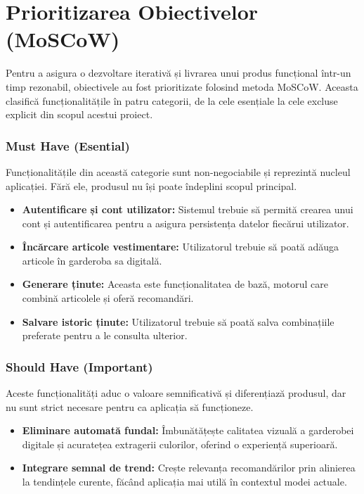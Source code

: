 \section{Prioritizarea Obiectivelor (MoSCoW)}

Pentru a asigura o dezvoltare iterativă și livrarea unui produs funcțional într-un timp rezonabil, obiectivele au fost prioritizate folosind metoda MoSCoW. Aceasta clasifică funcționalitățile în patru categorii, de la cele esențiale la cele excluse explicit din scopul acestui proiect.

\subsubsection{Must Have (Esential)}
Funcționalitățile din această categorie sunt non-negociabile și reprezintă nucleul aplicației. Fără ele, produsul nu își poate îndeplini scopul principal.
\begin{itemize}
    \item \textbf{Autentificare și cont utilizator:} Sistemul trebuie să permită crearea unui cont și autentificarea pentru a asigura persistența datelor fiecărui utilizator.
    \item \textbf{Încărcare articole vestimentare:} Utilizatorul trebuie să poată adăuga articole în garderoba sa digitală.
    \item \textbf{Generare ținute:} Aceasta este funcționalitatea de bază, motorul care combină articolele și oferă recomandări.
    \item \textbf{Salvare istoric ținute:} Utilizatorul trebuie să poată salva combinațiile preferate pentru a le consulta ulterior.
\end{itemize}

\subsubsection{Should Have (Important)}
Aceste funcționalități aduc o valoare semnificativă și diferențiază produsul, dar nu sunt strict necesare pentru ca aplicația să funcționeze.
\begin{itemize}
    \item \textbf{Eliminare automată fundal:} Îmbunătățește calitatea vizuală a garderobei digitale și acuratețea extragerii culorilor, oferind o experiență superioară.
    \item \textbf{Integrare semnal de trend:} Crește relevanța recomandărilor prin alinierea la tendințele curente, făcând aplicația mai utilă în contextul modei actuale.
\end{itemize}


